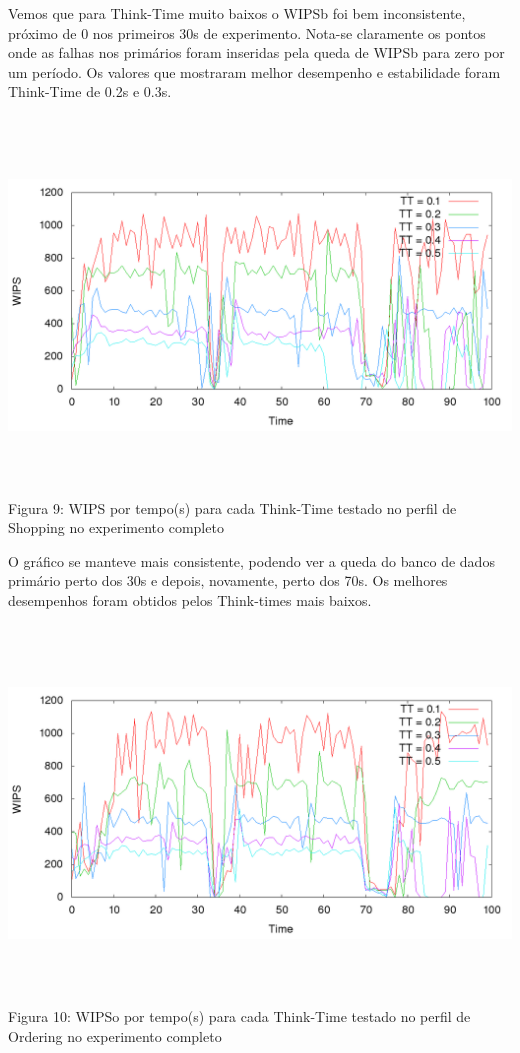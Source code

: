 \documentclass[11pt,twoside]{article}
\begin{document}
Vemos que para Think-Time muito baixos o WIPSb foi bem inconsistente, próximo de 0 nos primeiros 30s de experimento. Nota-se claramente os pontos onde as falhas nos primários foram inseridas pela queda de WIPSb para zero por um período. Os valores que mostraram melhor desempenho e estabilidade foram Think-Time de 0.2s e 0.3s.

\begin{center}
\includegraphics[width=15cm, height=10cm]{images/completo/plot_shopping.png}
Figura 9: WIPS por tempo(s) para cada Think-Time testado no perfil de Shopping no experimento completo
\end{center}

O gráfico se manteve mais consistente, podendo ver a queda do banco de dados primário perto dos 30s e depois, novamente, perto dos 70s.  Os melhores desempenhos foram obtidos pelos Think-times mais baixos.

\begin{center}
\includegraphics[width=15cm, height=10cm]{images/completo/plot_ordering.png}
Figura 10: WIPSo por tempo(s) para cada Think-Time testado no perfil de Ordering no experimento completo
\end{center}
\end{document}
